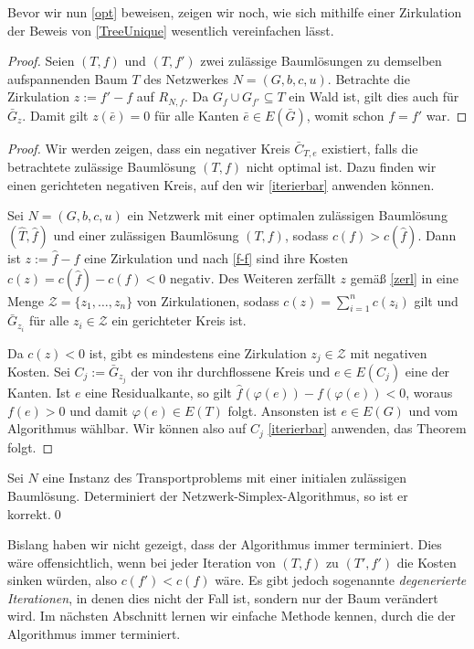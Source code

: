 Bevor wir nun \cref{opt} beweisen, zeigen wir noch, wie sich mithilfe einer Zirkulation der Beweis von \cref{TreeUnique} wesentlich vereinfachen lässt. 

\TreeUnique*
\begin{proof}Seien $(T,f)$ und $(T,f')$ zwei zulässige Baumlösungen zu demselben aufspannenden Baum $T$ des Netzwerkes $N=(G,b,c,u)$. Betrachte die Zirkulation $z:=f'-f$ auf $R_{N,f}$. Da $G_f\cup G_{f'}\subseteq T$ ein Wald ist, gilt dies auch für $\bar{G}_z$. Damit gilt $z(\bar{e}) = 0$ für alle Kanten $\bar{e}\in E(\bar{G})$, womit schon $f=f'$ war.\end{proof}

\Opt*
\begin{proof}Wir werden zeigen, dass ein negativer Kreis $\bar{C}_{T,e}$ existiert, falls die betrachtete zulässige Baumlösung $(T,f)$ nicht optimal ist. Dazu finden wir einen gerichteten negativen Kreis, auf den wir \cref{iterierbar} anwenden können.
	
Sei $N=(G,b,c,u)$ ein Netzwerk mit einer optimalen zulässigen Baumlösung $(\hat{T},\hat{f})$ und einer zulässigen Baumlösung $(T,f)$, sodass $c(f)>c(\hat{f})$. Dann ist $z:=\hat{f}-f$ eine Zirkulation und nach \cref{f-f} sind ihre Kosten $c(z)=c(\hat{f})-c(f)<0$ negativ. Des Weiteren zerfällt $z$ gemäß \cref{zerl} in eine Menge $\mathscr{Z}=\{z_1,\ldots,z_n\}$ von Zirkulationen, sodass $c(z)=\sum_{i=1}^{n} c(z_i)$ gilt und $\bar{G}_{z_i}$ für alle $z_i\in\mathscr{Z}$ ein gerichteter Kreis ist.  

Da $c(z)<0$ ist, gibt es mindestens eine Zirkulation $z_j\in\mathscr{Z}$ mit negativen Kosten. Sei $C_j:=\bar{G}_{z_j}$ der von ihr durchflossene Kreis und $e\in E(C_j)$ eine der Kanten. Ist $e$ eine Residualkante, so gilt $\hat{f}(\varphi(e))-f(\varphi(e))<0$, woraus $f(e)>0$ und damit $\varphi(e)\in E(T)$ folgt. Ansonsten ist $e\in E(G)$ und vom Algorithmus wählbar. Wir können also auf $C_j$ \cref{iterierbar} anwenden, das Theorem folgt.\end{proof}

\begin{kor}\label{korrekt}Sei $N$ eine Instanz des Transportproblems mit einer initialen zulässigen Baumlösung. Determiniert der Netzwerk-Simplex-Algorithmus, so ist er korrekt.\qed\end{kor}

Bislang haben wir nicht gezeigt, dass der Algorithmus immer terminiert. Dies wäre offensichtlich, wenn bei jeder Iteration von $(T,f)$ zu $(T',f')$ die Kosten sinken würden, also $c(f')<c(f)$ wäre. Es gibt jedoch sogenannte \emph{degenerierte Iterationen}, in denen dies nicht der Fall ist, sondern nur der Baum verändert wird. Im nächsten Abschnitt lernen wir einfache Methode kennen, durch die der Algorithmus immer terminiert.

